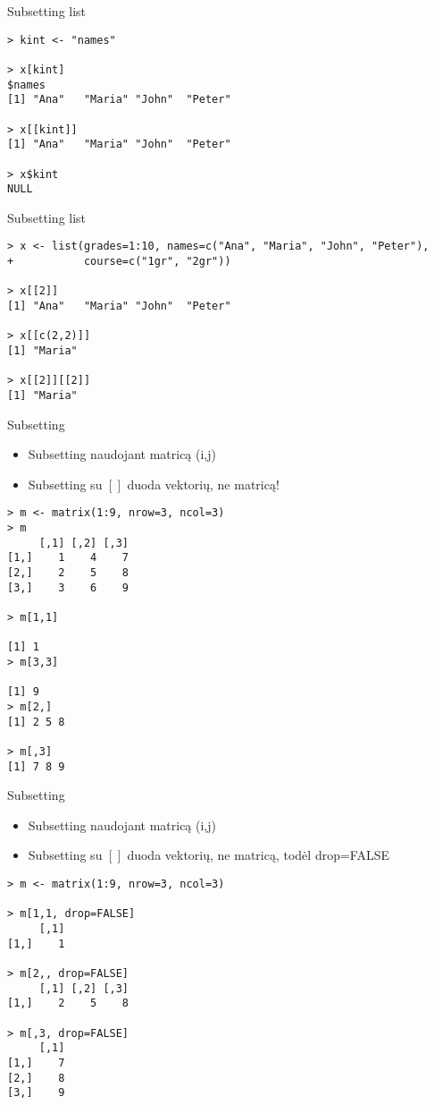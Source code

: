 \documentclass[11pt,xcolor=table]{beamer}
\begin{document}
\begin{frame}[fragile]{Subsetting list}
\begin{lstlisting}
> kint <- "names"

> x[kint]
$names
[1] "Ana"   "Maria" "John"  "Peter"

> x[[kint]]
[1] "Ana"   "Maria" "John"  "Peter"

> x$kint
NULL
\end{lstlisting}
\end{frame}


\begin{frame}[fragile]{Subsetting list}
\begin{lstlisting}
> x <- list(grades=1:10, names=c("Ana", "Maria", "John", "Peter"), 
+           course=c("1gr", "2gr"))

> x[[2]]
[1] "Ana"   "Maria" "John"  "Peter"

> x[[c(2,2)]]
[1] "Maria"

> x[[2]][[2]]
[1] "Maria"
\end{lstlisting}
\end{frame}

\begin{frame}[fragile]{Subsetting}
\begin{itemize}
\item Subsetting naudojant matricą (i,j) 
\item Subsetting su $[]$ duoda vektorių, ne matricą!
\end{itemize}
\begin{lstlisting}
> m <- matrix(1:9, nrow=3, ncol=3)
> m
     [,1] [,2] [,3]
[1,]    1    4    7
[2,]    2    5    8
[3,]    3    6    9

> m[1,1]

[1] 1
> m[3,3]

[1] 9
> m[2,]
[1] 2 5 8

> m[,3]
[1] 7 8 9
\end{lstlisting}
\end{frame}

\begin{frame}[fragile]{Subsetting}
\begin{itemize}
\item Subsetting naudojant matricą (i,j) 
\item Subsetting su $[]$ duoda vektorių, ne matricą, todėl drop=FALSE
\end{itemize}
\begin{lstlisting}
> m <- matrix(1:9, nrow=3, ncol=3)

> m[1,1, drop=FALSE]
     [,1]
[1,]    1

> m[2,, drop=FALSE]
     [,1] [,2] [,3]
[1,]    2    5    8

> m[,3, drop=FALSE]
     [,1]
[1,]    7
[2,]    8
[3,]    9
\end{lstlisting}
\end{frame}
\end{document}
